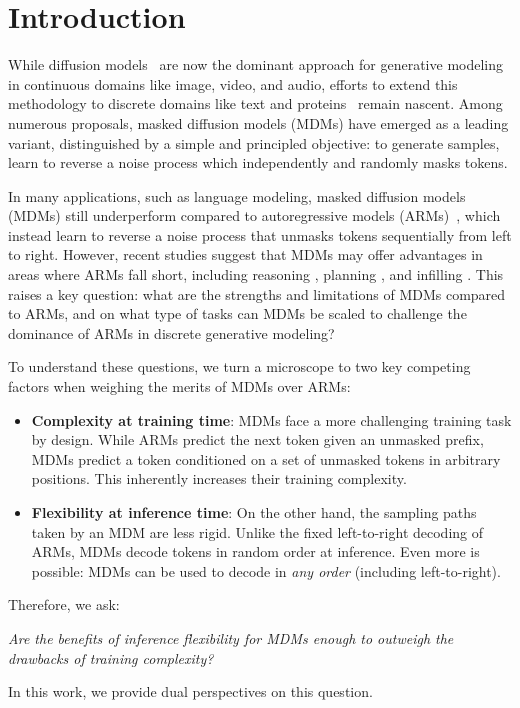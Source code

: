 \documentclass{article}
\theoremstyle{plain}
\theoremstyle{definition}
\theoremstyle{remark}
\begin{document}
\section{Introduction}

While diffusion models~\cite{ho2020denoising,song2021score} are now the dominant approach for generative modeling in continuous domains like image, video, and audio, efforts to extend this methodology to discrete domains like text and proteins~\cite{austin2023structured,lou2024discrete,hoogeboom2021argmax} remain nascent. Among numerous proposals, masked diffusion models (MDMs) \cite{lou2024discrete,sahoo2024simple,shi2025simplified} have emerged as a leading variant, distinguished by a simple and principled objective: to generate samples, learn to reverse a noise process which independently and randomly masks tokens. 


In many applications, such as language modeling, masked diffusion models (MDMs) still underperform compared to autoregressive models (ARMs)~\cite{nie2024scaling,zheng2024maskeddiffusionmodelssecretly}, which instead learn to reverse a noise process that unmasks tokens sequentially from left to right. However, recent studies suggest that MDMs may offer advantages in areas where ARMs fall short, including reasoning \cite{nie2024scaling,kitouni2024factorization}, planning \cite{ye2024beyond}, and infilling \cite{gong2024scaling}. This raises a key question: what are the strengths and limitations of MDMs compared to ARMs, and on what type of tasks can MDMs be scaled to challenge the dominance of ARMs in discrete generative modeling?

To understand these questions, we turn a microscope to two key competing factors when weighing the merits of MDMs over ARMs:
\begin{itemize}[leftmargin=*,topsep=0pt,itemsep=0pt]
    \item \textbf{Complexity at training time}: MDMs face a more challenging training task by design. While ARMs predict the next token given an unmasked prefix, MDMs predict a token conditioned on a set of unmasked tokens in arbitrary positions. This inherently increases their training complexity.
    \item \textbf{Flexibility at inference time}: On the other hand, the sampling paths taken by an MDM are less rigid. Unlike the fixed left-to-right decoding of ARMs, MDMs decode tokens in random order at inference. Even more is possible: MDMs can be used to decode in \emph{any order} (including left-to-right). 
\end{itemize}
Therefore, we ask:
\begin{center}
    \emph{Are the benefits of inference flexibility for MDMs enough to outweigh the drawbacks of training complexity?}
\end{center}
In this work, we provide dual perspectives on this question.
\end{document}
